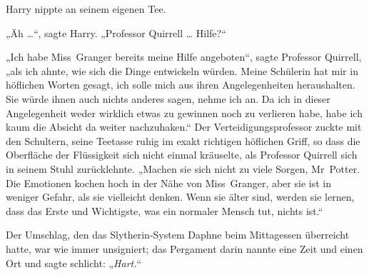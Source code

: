 Harry nippte an seinem eigenen Tee.

„Äh …“, sagte Harry.
„Professor Quirrell … Hilfe?“

„Ich habe Miss~Granger bereits meine Hilfe angeboten“, sagte Professor Quirrell, „als ich ahnte, wie sich die Dinge entwickeln würden. Meine Schülerin hat mir in höflichen Worten gesagt, ich solle mich aus ihren Angelegenheiten heraushalten. Sie würde ihnen auch nichts anderes sagen, nehme ich an. Da ich in dieser Angelegenheit weder wirklich etwas zu gewinnen noch zu verlieren habe, habe ich kaum die Absicht da weiter nachzuhaken.“ Der Verteidigungsprofessor zuckte mit den Schultern, seine Teetasse ruhig im exakt richtigen höflichen Griff, so dass die Oberfläche der Flüssigkeit sich nicht einmal kräuselte, als Professor Quirrell sich in seinem Stuhl zurücklehnte.
„Machen sie sich nicht zu viele Sorgen, Mr~Potter. Die Emotionen kochen hoch in der Nähe von Miss~Granger, aber sie ist in weniger Gefahr, als sie vielleicht denken. Wenn sie älter sind, werden sie lernen, dass das Erste und Wichtigste, was ein normaler Mensch tut, nichts ist.“

\later

Der Umschlag, den das Slytherin-System Daphne beim Mittagessen überreicht hatte, war wie immer unsigniert; das Pergament darin nannte eine Zeit und einen Ort und sagte schlicht:
„\emph{Hart.}“

